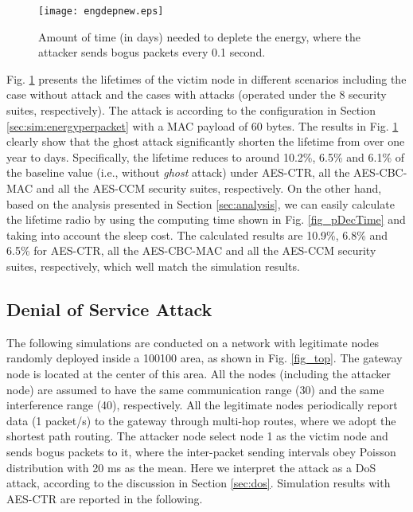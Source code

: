 \documentclass[10pt,journal,cspaper,compsoc]{IEEEtran}
\begin{document}
\begin{figure}[!ht]
\vspace{-2mm}
	\centering
	\texttt{[image: engdepnew.eps]}
	\caption{Amount of time (in days) needed to deplete the energy, where the attacker sends bogus packets every 0.1 second.}
	\label{fig_engdep}	
\end{figure}

Fig. \ref{fig_engdep} presents the lifetimes of the victim node in different scenarios including the case without attack and the cases with attacks (operated under the 8 security suites, respectively).  The attack is according to the configuration in Section \ref{sec:sim:energyperpacket} with a MAC payload of 60 bytes. The results in Fig. \ref{fig_engdep} clearly show that the ghost attack significantly shorten the lifetime from over one year to days. Specifically, the lifetime reduces to around 10.2\%, 6.5\% and 6.1\% of the baseline value (i.e., without {\em ghost} attack) under AES-CTR, all the AES-CBC-MAC and all the AES-CCM security suites, respectively. On the other hand, based on the analysis presented in Section \ref{sec:analysis}, we can easily calculate the lifetime radio  by using the computing time shown in Fig. \ref{fig_pDecTime} and taking into account the sleep cost. The calculated results are 10.9\%, 6.8\% and 6.5\% for AES-CTR, all the AES-CBC-MAC and all the AES-CCM security suites, respectively, which well match the simulation results.


\subsection{Denial of Service Attack}
The following simulations are conducted on a network with  legitimate nodes randomly deployed inside a 100100  area, as shown in Fig. \ref{fig_top}. The gateway node is located at the center of this area. All the nodes (including the attacker node) are assumed to have the same communication range (30) and the same interference range (40), respectively. All the legitimate nodes periodically report data (1 packet/s) to the gateway through multi-hop routes, where we adopt the shortest path routing. The attacker node select node 1 as the victim node and sends bogus packets to it, where the inter-packet sending intervals obey Poisson distribution with 20 ms as the mean. Here we interpret the attack as a DoS attack, according to the discussion in Section \ref{sec:dos}. Simulation results with AES-CTR are reported in the following.
\end{document}
